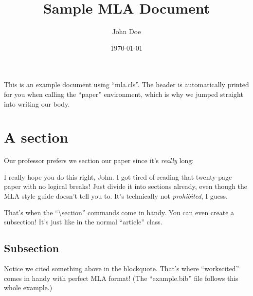 \documentclass[mla7]{mla}
\title{Sample MLA Document}
\author{John Doe}
\date{\today}
\begin{document}
\begin{paper}

This is an example document using ``mla.cls''.
The header is automatically printed for you when calling the
``paper'' environment, which is why we jumped straight into
writing our body.

\section{A section}

Our professor prefers we section our paper since it's
\emph{really} long:

\begin{blockquote}
I really hope you do this right, John.
I got tired of reading that twenty-page paper with no logical breaks!
Just divide it into sections already, even though the MLA style guide
doesn't tell you to.
It's technically not \emph{prohibited}, I guess.  \cite{que2019}
\end{blockquote}

That's when the ``\textbackslash{}section'' commands come in handy.
You can even create a subsection!
It's just like in the normal ``article'' class.

\subsection{Subsection}

Notice we cited something above in the blockquote.
That's where ``workscited'' comes in handy with perfect MLA format!
(The ``example.bib'' file follows this whole example.)

\end{paper}

\begin{workscited}



\printbibliography[heading=none]

\end{workscited}
\end{document}
